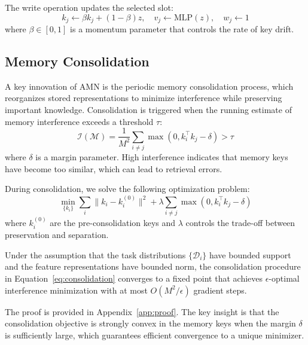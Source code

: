 \documentclass[11pt]{article}
\begin{document}
The write operation updates the selected slot:
\begin{equation}
    k_j \leftarrow \beta k_j + (1 - \beta) z, \quad v_j \leftarrow \text{MLP}(z), \quad w_j \leftarrow 1
\end{equation}
where $\beta \in [0, 1]$ is a momentum parameter that controls the rate of key drift.

\subsection{Memory Consolidation}
\label{sec:consolidation}

A key innovation of AMN is the periodic memory consolidation process, which reorganizes stored representations to minimize interference while preserving important knowledge. Consolidation is triggered when the running estimate of memory interference exceeds a threshold $\tau$:
\begin{equation}
    \mathcal{I}(\mathcal{M}) = \frac{1}{M^2} \sum_{i \neq j} \max(0, k_i^\top k_j - \delta) > \tau
\end{equation}
where $\delta$ is a margin parameter. High interference indicates that memory keys have become too similar, which can lead to retrieval errors.

During consolidation, we solve the following optimization problem:
\begin{equation}
    \min_{\{k_i\}} \sum_{i} \|k_i - k_i^{(0)}\|^2 + \lambda \sum_{i \neq j} \max(0, k_i^\top k_j - \delta)
    \label{eq:consolidation}
\end{equation}
where $k_i^{(0)}$ are the pre-consolidation keys and $\lambda$ controls the trade-off between preservation and separation.

\begin{theorem}
\label{thm:convergence}
Under the assumption that the task distributions $\{\mathcal{D}_i\}$ have bounded support and the feature representations have bounded norm, the consolidation procedure in Equation~\ref{eq:consolidation} converges to a fixed point that achieves $\epsilon$-optimal interference minimization with at most $O(M^2 / \epsilon)$ gradient steps.
\end{theorem}

The proof is provided in Appendix~\ref{app:proof}. The key insight is that the consolidation objective is strongly convex in the memory keys when the margin $\delta$ is sufficiently large, which guarantees efficient convergence to a unique minimizer.
\end{document}
